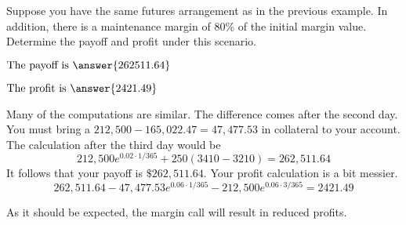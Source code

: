 \documentclass{ximera}
\begin{document}
\begin{question}
Suppose you have the same futures arrangement as in the previous example. In addition, there is a maintenance margin of 80\% of the initial margin value. Determine the payoff and profit under this scenario.
	\begin{prompt}

	$\text{The payoff is }\answer{262511.64}$

	$\text{The profit is }\answer{2421.49}$

	\end{prompt}

\end{question}

\begin{solution}
Many of the computations are similar. The difference comes after the second day. You must bring a $212,500-165,022.47=47,477.53$ in collateral to your account. The calculation after the third day would be
	\begin{equation*}
	212,500e^{0.02\cdot 1/365}+250(3410-3210)=262,511.64
	\end{equation*}
It follows that your payoff is $\$262,511.64$. Your profit calculation is a bit messier.
	\begin{equation*}
	262,511.64-47,477.53e^{0.06\cdot 1/365}-212,500e^{0.06\cdot 3/365}=2421.49
	\end{equation*}
\end{solution}

As it should be expected, the margin call will result in reduced profits.


 
\end{document}
